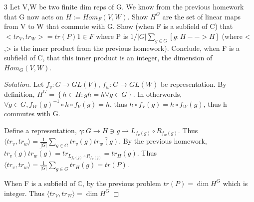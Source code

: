 \documentclass{article}
\newcommand{\C}{\mathbb{C}}
\newcommand{\angles}[1]{\langle #1 \rangle}
\newenvironment{solution}
{\renewcommand\qedsymbol{$\blacksquare$}\begin{proof}[Solution]}
{\end{proof}}
\begin{document}
\bigskip

\begin{PROB}{3}\label{Problem 3.}
    Let V,W be two finite dim reps of G. We know from the previous homework that G now acts on $H := Hom_F(V,W)$.  Show $H^G$ are the set of linear maps from V to W that commute with G. Show (when F is a subfield of C) that $<tr_V,tr_W> = tr(P)1 \in F$ where P is $1/|G| \sum_{g \in G} [g: H --> H]$ (where < ,> is the inner product from the previous homework). Conclude, when F is a subfield of C, that this inner product is an integer, the dimension of$ Hom_G(V,W)$.
\end{PROB}
\begin{solution}
    Let $f_v : G \to GL(V)$, $f_w: G \to GL(W)$ be representation. 
    By definition, $H^G = \left\{ h \in H : gh = h \forall g \in G \right\}$. In otherwords, $\forall g \in G, f_W(g)^{-1} \circ h \circ f_V(g) = h$, thus $h \circ f_V(g) = h \circ f_W(g)$, thus h commutes with G. 
    
    Define a representation, $\gamma: G \to H \ni g \to L_{f_v(g)} \circ R_{f_w(g)}$. Thus $\angles{tr_v, tr_w} = \frac{1}{|G|} \sum_{g \in G} tr_v(g) \bar{tr_w(g)}$. By the previous homework, $tr_v(g) \bar{tr_w(g)} = tr_{L_{f_v(g)} \circ R_{f_w(g)}} = tr_{H}(g)$. Thus $\angles{tr_v, tr_w} = \frac{1}{|G|} \sum_{g \in G} tr_{H}(g) = tr(P)$. 
    
    When F is a subfield of $\C$, by the previous problem $tr(P) = \dim H^G$ which is integer. Thus $\angles{tr_V, tr_W} =  \dim H^G$   
\end{solution}

\bigskip
\end{document}
